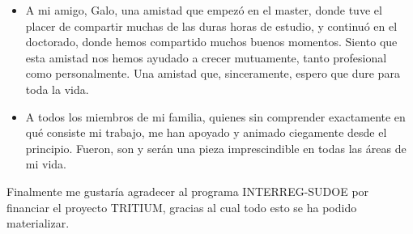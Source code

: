 \begin{itemize}
\item{} A mi amigo, Galo, una amistad que empezó en el master, donde tuve el placer de compartir muchas de las duras horas de estudio, y continuó en el doctorado, donde hemos compartido muchos buenos momentos. Siento que esta amistad nos hemos ayudado a crecer mutuamente, tanto profesional como personalmente. Una amistad que, sinceramente, espero que dure para toda la vida.

\item{} A todos los miembros de mi familia, quienes sin comprender exactamente en qué consiste mi trabajo, me han apoyado y animado ciegamente desde el principio. Fueron, son y serán una pieza imprescindible en todas las áreas de mi vida.

\end{itemize} 

Finalmente me gustaría agradecer al programa INTERREG-SUDOE por financiar el proyecto TRITIUM, gracias al cual todo esto se ha podido materializar.